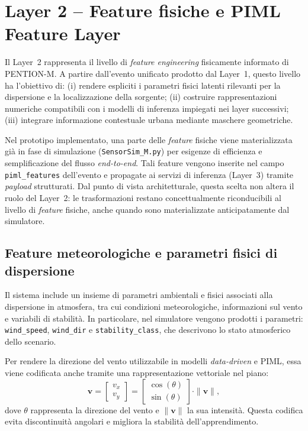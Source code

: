 \section{Layer 2 -- Feature fisiche e PIML Feature Layer}
\label{sec:layer2_features}

Il Layer~2 rappresenta il livello di \emph{feature engineering} fisicamente informato di \textsc{PENTION-M}.
A partire dall’evento unificato prodotto dal Layer~1, questo livello ha l’obiettivo di:
(i) rendere espliciti i parametri fisici latenti rilevanti per la dispersione e la localizzazione della sorgente;
(ii) costruire rappresentazioni numeriche compatibili con i modelli di inferenza impiegati nei layer successivi;
(iii) integrare informazione contestuale urbana mediante maschere geometriche.

Nel prototipo implementato, una parte delle \textit{feature} fisiche viene materializzata già in fase di simulazione (\texttt{SensorSim\_M.py}) per esigenze di efficienza e semplificazione del flusso \textit{end-to-end}.
Tali feature vengono inserite nel campo \texttt{piml\_features} dell’evento e propagate ai servizi di inferenza (Layer~3) tramite \textit{payload} strutturati.
Dal punto di vista architetturale, questa scelta non altera il ruolo del Layer~2: le trasformazioni restano concettualmente riconducibili al livello di \textit{feature} fisiche, anche quando sono materializzate anticipatamente dal simulatore.

\subsection{Feature meteorologiche e parametri fisici di dispersione}

Il sistema include un insieme di parametri ambientali e fisici associati alla dispersione in atmosfera, tra cui condizioni meteorologiche, informazioni sul vento e variabili di stabilità.
In particolare, nel simulatore vengono prodotti i parametri:
\texttt{wind\_speed}, \texttt{wind\_dir} e \texttt{stability\_class}, che descrivono lo stato atmosferico dello scenario.

Per rendere la direzione del vento utilizzabile in modelli \textit{data-driven} e PIML, essa viene codificata anche tramite una rappresentazione vettoriale nel piano:
\begin{equation}
	\mathbf{v} =
	\begin{bmatrix}
		v_x \\ v_y
	\end{bmatrix}
	=
	\begin{bmatrix}
		\cos(\theta) \\ \sin(\theta)
	\end{bmatrix}
	\cdot \|\mathbf{v}\|,
\end{equation}
dove $\theta$ rappresenta la direzione del vento e $\|\mathbf{v}\|$ la sua intensità.
Questa codifica evita discontinuità angolari e migliora la stabilità dell’apprendimento.

